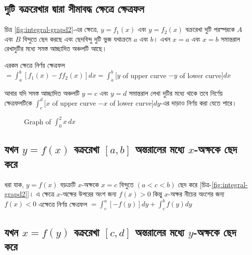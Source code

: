 \subsection{দুটি বক্ররেখার দ্বারা সীমাবদ্ধ ক্ষেত্রে ক্ষেত্রফল}
    চিত্র \ref{fig:integral-grapd2}-এর ক্ষেত্রে, $y = f_1(x)$ এবং $y = f_2(x)$ 
    বক্ররেখা দুটি পরস্পরকে $A$ এবং $B$ বিন্দুতে ছেদ করছে এবং ছেদবিন্দু দুটি ভুজ যথাক্রমে $a$ এবং $b$।
    এখন $x = a$ এবং $x = b$ সমান্তরাল রেখাদুটির মধ্যে সমস্ত আচ্ছাদিত অঞ্চলটি আছে।

    এরকম ক্ষেত্রে নির্ণয় ক্ষেত্রফল\\ $= \int_{a}^{b}[f_1(x) -f f_2(x)]dx = \int_{a}^{b}[y$ of upper curve $- y$ of lower curve$]dx$

    আবার যদি সমস্ত আচ্ছাদিত অঞ্চলটি $y = c$ এবং $y = d$ সমান্তরাল লেখা দুটির মধ্যে থাকে তবে নির্ণেয় ক্ষেত্রফলটিকে
    $\int_{c}^{d}[x$ of upper curve $- x$ of lower curve$]dy$-এর দাড়াও নির্ণয় করা যেতে পারে।

    \begin{figure}[h]
    \centering
    \caption{Graph of $\int_{0}^{2} x \, dx$}
    \label{fig:integralsdfssd-graph}
    \end{figure}

\newpage
\subsection{যখন $y = f(x)$ বক্ররেখা $[a,b]$ অন্তরালের মধ্যে $x$-অক্ষকে ছেদ করে}

    ধরা যাক, $y = f(x)$ বড়ক্রটি $x$-অক্ষকে $x = c$ বিন্দুতে $(a < c < b)$ ছেদ করে [চিত্র-\ref{fig:integral-grapd2}]।
    এ ক্ষেত্রে $x$-অক্ষের উপরের অংশ জন্য $f(x) > 0$ কিন্তু $x$-অক্ষর নীচের অংশের জন্য $f(x) < 0$
    এক্ষেত্রে নির্ণয় ক্ষেত্রফল $= \int_{c}^{a}[-f(y)]dy + \int_{c}^{b}f(y)dy$

\subsection{যখন $x = f(y)$ বক্ররেখা $[c,d]$ অন্তরালের মধ্যে $y$-অক্ষকে ছেদ করে}

